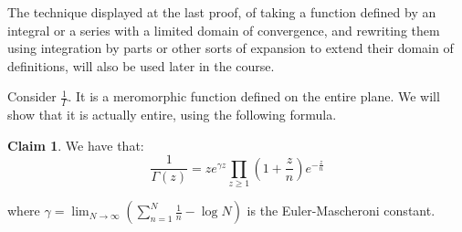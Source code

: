 \documentclass[11pt]{article} %
\theoremstyle{definition}
\newtheorem{claim}[theorem]{Claim}
\begin{document}
The technique displayed at the last proof, of taking a function defined by an integral or a series with a limited domain of convergence, and rewriting them using integration by parts or other sorts of expansion to extend their domain of definitions, will also be used later in the course.

Consider $\frac{1}{\Gamma}$. It is a meromorphic function defined on the entire plane. We will show that it is actually entire, using the following formula.

\begin{claim}
We have that:
\[ \frac{1}{\Gamma\left(z\right)} = ze^{\gamma z} \prod_{z \geq 1} \left(1+\frac{z}{n}\right)e^{-\frac{z}{n}}\]

where $\gamma = \lim_{N\to \infty} \left(\sum_{n=1}^N\frac{1}{n} - \log N\right)$ is the Euler-Mascheroni constant.  
\end{claim}
\end{document}
